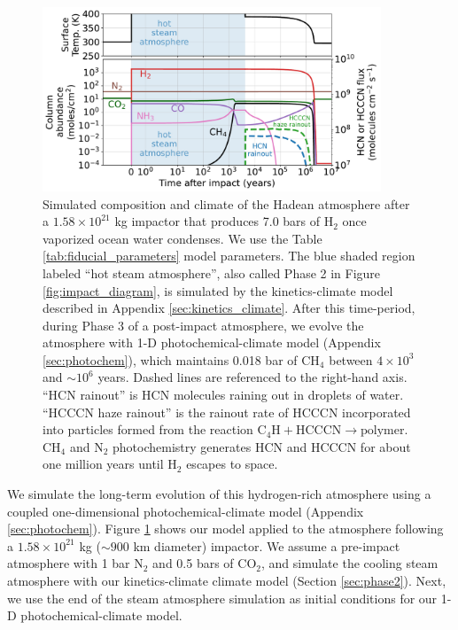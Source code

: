 \begin{figure}
  \centering
  \includegraphics[width=0.9\textwidth]{tex/5impacts/figures/Figure4.pdf}
  \caption{Simulated composition and climate of the Hadean atmosphere after a $1.58 \times 10^{21}$ kg impactor that produces 7.0 bars of H$_2$ once vaporized ocean water condenses. We use the Table \ref{tab:fiducial_parameters} model parameters. The blue shaded region labeled ``hot steam atmosphere'', also called Phase 2 in Figure \ref{fig:impact_diagram}, is simulated by the kinetics-climate model described in Appendix \ref{sec:kinetics_climate}. After this time-period, during Phase 3 of a post-impact atmosphere, we evolve the atmosphere with 1-D photochemical-climate model (Appendix \ref{sec:photochem}), which maintains 0.018 bar of CH$_4$ between $4 \times 10^3$ and $\sim 10^6$ years. Dashed lines are referenced to the right-hand axis. ``HCN rainout'' is HCN molecules raining out in droplets of water. ``HCCCN haze rainout'' is the rainout rate of HCCCN incorporated into particles formed from the reaction $\mathrm{C_4H} + \mathrm{HCCCN} \rightarrow \mathrm{polymer}$. CH$_4$ and N$_2$ photochemistry generates HCN and HCCCN for about one million years until H$_2$ escapes to space.}
  \label{fig:figure4}
\end{figure}

We simulate the long-term evolution of this hydrogen-rich atmosphere using a coupled one-dimensional photochemical-climate model (Appendix \ref{sec:photochem}). Figure \ref{fig:figure4} shows our model applied to the atmosphere following a $1.58 \times 10^{21}$ kg ($\sim 900$ km diameter) impactor. We assume a pre-impact atmosphere with 1 bar N$_2$ and 0.5 bars of CO$_2$, and simulate the cooling steam atmosphere with our kinetics-climate climate model (Section \ref{sec:phase2}). Next, we use the end of the steam atmosphere simulation as initial conditions for our 1-D photochemical-climate model. 

